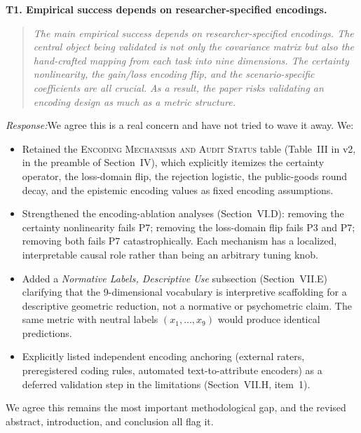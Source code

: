 \documentclass[11pt]{article}
\newcommand{\rev}[1]{\textbf{#1}}
\newcommand{\resp}{\medskip\noindent\emph{Response:}\quad}
\begin{document}
\rev{T1. Empirical success depends on researcher-specified encodings.}
\begin{quote}\itshape\small
The main empirical success depends on researcher-specified encodings. The central object being validated is not only the covariance matrix but also the hand-crafted mapping from each task into nine dimensions. The certainty nonlinearity, the gain/loss encoding flip, and the scenario-specific coefficients are all crucial. As a result, the paper risks validating an encoding design as much as a metric structure.
\end{quote}
\resp We agree this is a real concern and have not tried to wave it away. We:
\begin{itemize}[leftmargin=*]
  \item Retained the \textsc{Encoding Mechanisms and Audit Status} table
        (Table~III in v2, in the preamble of Section~IV), which explicitly itemizes
        the certainty operator, the loss-domain flip, the rejection logistic, the
        public-goods round decay, and the epistemic encoding values as fixed encoding
        assumptions.
  \item Strengthened the encoding-ablation analyses (Section~VI.D):
        removing the certainty nonlinearity fails P7; removing the loss-domain flip fails
        P3 and P7; removing both fails P7 catastrophically. Each mechanism has a localized,
        interpretable causal role rather than being an arbitrary tuning knob.
  \item Added a \emph{Normative Labels, Descriptive Use} subsection (Section~VII.E)
        clarifying that the 9-dimensional vocabulary is interpretive scaffolding for a
        descriptive geometric reduction, not a normative or psychometric claim. The same
        metric with neutral labels $(x_1,\ldots,x_9)$ would produce identical predictions.
  \item Explicitly listed independent encoding anchoring (external raters, preregistered
        coding rules, automated text-to-attribute encoders) as a deferred validation step
        in the limitations (Section~VII.H, item~1).
\end{itemize}
We agree this remains the most important methodological gap, and the revised abstract,
introduction, and conclusion all flag it.
\end{document}

